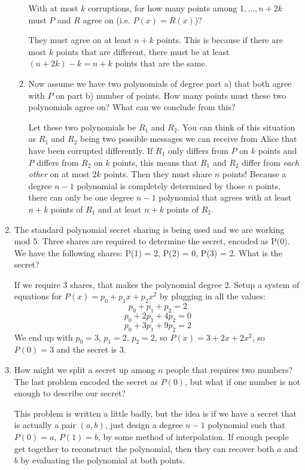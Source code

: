 \documentclass{article}
\begin{document}
\begin{enumerate}
\begin{enumerate}
            With at most $k$ corruptions, for how many points among $1, \ldots, n+2k$ must $P$ and $R$ agree on (i.e. $P(x) = R(x)$)?
            \begin{solution}
                They must agree on at least $n+k$ points. This is because if there are most $k$ points that are different, there must be at least $(n + 2k) - k = n+k$ points that are the same.
            \end{solution}
            \item Now assume we have two polynomials of degree part a) that both agree with $P$ on part b) number of points. How many points must these
            two polynomials agree on? What can we conclude from this?
            \begin{solution}
                Let these two polynomials be $R_1$ and $R_2$. You can think of this situation as $R_1$ and $R_2$ being two possible messages we can receive from Alice that have been corrupted differently.
                If $R_1$ only differs from $P$ on $k$ points and $P$ differs from $R_2$ on $k$ points, this means that $R_1$ and $R_2$ differ from \textit{each other} on at most $2k$ points. Then they must
                share $n$ points! Because a degree $n-1$ polynomial is completely determined by those $n$ points, there can only be one degree $n-1$ polynomial that agrees with at least $n+k$ points of $R_1$ and at least $n+k$ points of $R_2$.
            \end{solution}
        \end{enumerate}
        \item The standard polynomial secret sharing is being used and we are working mod 5. Three shares are required to determine the secret, encoded as P(0). We have the following shares: P(1) = 2, P(2) = 0, P(3) = 2. What is the secret?
        \begin{solution}
            If we require 3 shares, that makes the polynomial degree 2.
            Setup a system of equations for $P(x) = p_0 + p_1 x + p_2 x^2$ by plugging in all the values:
            \[
                p_0 + p_1 + p_2 = 2
            \]
            \[
                p_0 + 2 p_1 + 4 p_2 = 0
            \]
            \[
                p_0 + 3 p_1 + 9 p_2 = 2
            \]
            We end up with $p_0 = 3$, $p_1 = 2$, $p_2 = 2$, so $P(x) = 3 + 2 x + 2 x^2$, so $P(0) = 3$ and the secret is $3$.
        \end{solution}
        \item How might we split a secret up among $n$ people that requires two numbers? The last problem encoded the secret as $P(0)$, but what if one number is not
        enough to describe our secret?
        \begin{solution}
            This problem is written a little badly, but the idea is if we have a secret that is actually a pair $(a, b)$, just design a degree $n-1$ polynomial such that
            $P(0) = a$, $P(1) = b$, by some method of interpolation. If enough people get together to reconstruct the polynomial, then they can recover both $a$ and $b$ by
            evaluating the polynomial at both points.
        \end{solution}
    \end{enumerate}
\end{document}

